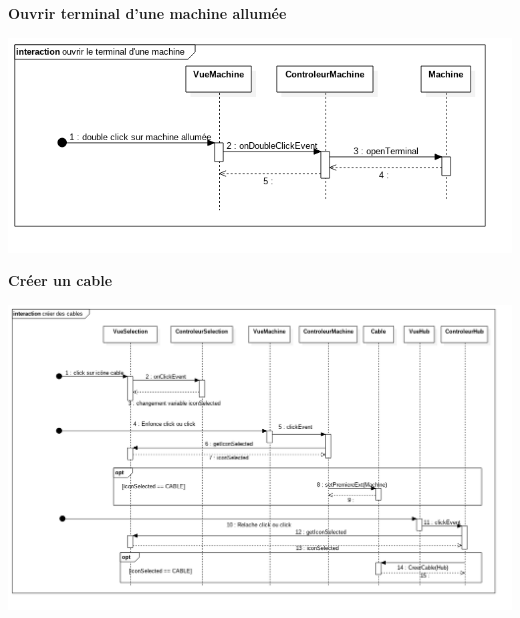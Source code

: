 \textbf{Ouvrir terminal d'une machine allumée} 
\begin{center}
\includegraphics[scale=0.6]{openterminal.png}
\end{center}

\vspace{16\baselineskip}
\textbf{Créer un cable} 
\begin{center}
\includegraphics[scale=0.4]{createcables.png}
\end{center}
\newpage